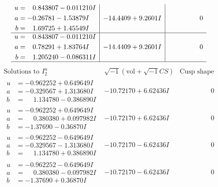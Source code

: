 \documentclass[1p]{elsarticle_modified}
\theoremstyle{definition}
\newcommand{\I}{\sqrt{-1}}
\begin{document}
$$\begin{array}{c|c|c}
\begin{aligned}
u &= \phantom{-}0.843807 - 0.011210 I \\
a &= -0.26781 - 1.53879 I \\
b &= \phantom{-}1.69725 + 1.45549 I\end{aligned}
 & -14.4409 + 9.2601 I & \phantom{-0.000000 } 0 \\ \hline\begin{aligned}
u &= \phantom{-}0.843807 - 0.011210 I \\
a &= \phantom{-}0.78291 + 1.83764 I \\
b &= \phantom{-}1.205240 - 0.086311 I\end{aligned}
 & -14.4409 + 9.2601 I & \phantom{-0.000000 } 0\\
 \hline 
 \end{array}$$\newpage$$\begin{array}{c|c|c}  
\text{Solutions to }I^u_{2}& \I (\text{vol} + \sqrt{-1}CS) & \text{Cusp shape}\\
 \hline 
\begin{aligned}
u &= -0.962252 + 0.649649 I \\
a &= -0.329567 + 1.313680 I \\
b &= \phantom{-}1.134780 - 0.386890 I\end{aligned}
 & -10.72170 + 6.62436 I & \phantom{-0.000000 } 0 \\ \hline\begin{aligned}
u &= -0.962252 + 0.649649 I \\
a &= \phantom{-}0.380380 + 0.097982 I \\
b &= -1.37690 - 0.36870 I\end{aligned}
 & -10.72170 + 6.62436 I & \phantom{-0.000000 } 0 \\ \hline\begin{aligned}
u &= -0.962252 - 0.649649 I \\
a &= -0.329567 - 1.313680 I \\
b &= \phantom{-}1.134780 + 0.386890 I\end{aligned}
 & -10.72170 - 6.62436 I & \phantom{-0.000000 } 0 \\ \hline\begin{aligned}
u &= -0.962252 - 0.649649 I \\
a &= \phantom{-}0.380380 - 0.097982 I \\
b &= -1.37690 + 0.36870 I\end{aligned}
 & -10.72170 - 6.62436 I & \phantom{-0.000000 } 0 \\ \hline\begin{aligned}

\end{aligned}
\end{array}$$
\end{document}
